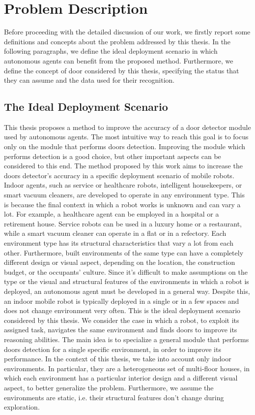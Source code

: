 \section{Problem Description}

Before proceeding with the detailed discussion of our work, we firstly report some definitions and concepts about the problem addressed by this thesis. In the following paragraphs, we define the ideal deployment scenario in which autonomous agents can benefit from the proposed method. Furthermore, we define the concept of door considered by this thesis, specifying the status that they can assume and the data used for their recognition.

\subsection{The Ideal Deployment Scenario}

This thesis proposes a method to improve the accuracy of a door detector module used by autonomous agents. The most intuitive way to reach this goal is to focus only on the module that performs doors detection. Improving the module which performs detection is a good choice, but other important aspects can be considered to this end. The method proposed by this work aims to increase the doors detector's accuracy in a specific deployment scenario of mobile robots. Indoor agents, such as service or healthcare robots, intelligent housekeepers, or smart vacuum cleaners, are developed to operate in any environment type. This is because the final context in which a robot works is unknown and can vary a lot. For example, a healthcare agent can be employed in a hospital or a retirement house. Service robots can be used in a luxury home or a restaurant, while a smart vacuum cleaner can operate in a flat or in a refectory. Each environment type has its structural characteristics that vary a lot from each other. Furthermore, built environments of the same type can have a completely different design or visual aspect, depending on the location, the construction budget, or the occupants' culture. Since it's difficult to make assumptions on the type or the visual and structural features of the environments in which a robot is deployed, an autonomous agent must be developed in a general way. Despite this, an indoor mobile robot is typically deployed in a single or in a few spaces and does not change environment very often. This is the ideal deployment scenario considered by this thesis. We consider the case in which a robot, to exploit its assigned task, navigates the same environment and finds doors to improve its reasoning abilities. The main idea is to specialize a general module that performs doors detection for a single specific environment, in order to improve its performance. In the context of this thesis, we take into account only indoor environments. In particular, they are a heterogeneous set of multi-floor houses, in which each environment has a particular interior design and a different visual aspect, to better generalize the problem. Furthermore, we assume the environments are static, i.e. their structural features don't change during exploration.

